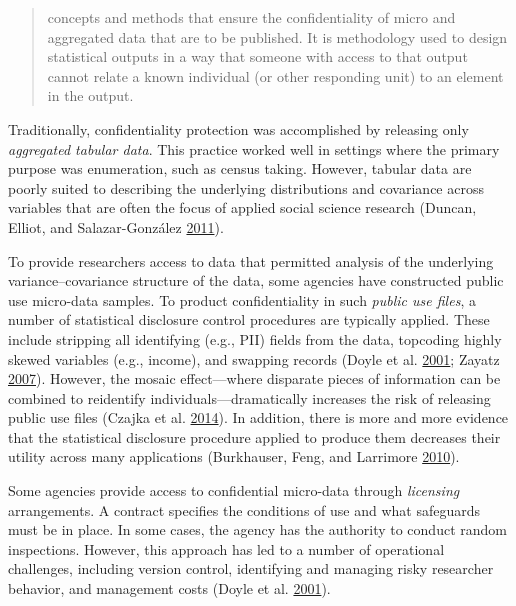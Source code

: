 \documentclass[]{krantz}
\begin{document}
\begin{quote}
concepts and methods that ensure the confidentiality of micro and
aggregated data that are to be published. It is methodology used to
design statistical outputs in a way that someone with access to that
output cannot relate a known individual (or other responding unit) to an
element in the output.
\end{quote}

Traditionally, confidentiality protection was accomplished by releasing
only \emph{aggregated tabular data}. This practice worked well in
settings where the primary purpose was enumeration, such as census
taking. However, tabular data are poorly suited to describing the
underlying distributions and covariance across variables that are often
the focus of applied social science research (Duncan, Elliot, and
Salazar-González \protect\hyperlink{ref-duncanstatistical}{2011}).

To provide researchers access to data that permitted analysis of the
underlying variance--covariance structure of the data, some agencies
have constructed public use micro-data samples. To product
confidentiality in such \emph{public use files}, a number of statistical
disclosure control procedures are typically applied. These include
stripping all identifying (e.g., PII) fields from the data, topcoding
highly skewed variables (e.g., income), and swapping records (Doyle et
al. \protect\hyperlink{ref-doyle2001confidentiality}{2001}; Zayatz
\protect\hyperlink{ref-zayatz2007disclosure}{2007}). However, the mosaic
effect---where disparate pieces of information can be combined to
reidentify individuals---dramatically increases the risk of releasing
public use files (Czajka et al.
\protect\hyperlink{ref-czajka2014minimizing}{2014}). In addition, there
is more and more evidence that the statistical disclosure procedure
applied to produce them decreases their utility across many applications
(Burkhauser, Feng, and Larrimore
\protect\hyperlink{ref-burkhauser2010improving}{2010}).

Some agencies provide access to confidential micro-data through
\emph{licensing} arrangements. A contract specifies the conditions of
use and what safeguards must be in place. In some cases, the agency has
the authority to conduct random inspections. However, this approach has
led to a number of operational challenges, including version control,
identifying and managing risky researcher behavior, and management costs
(Doyle et al. \protect\hyperlink{ref-doyle2001confidentiality}{2001}).
\end{document}
